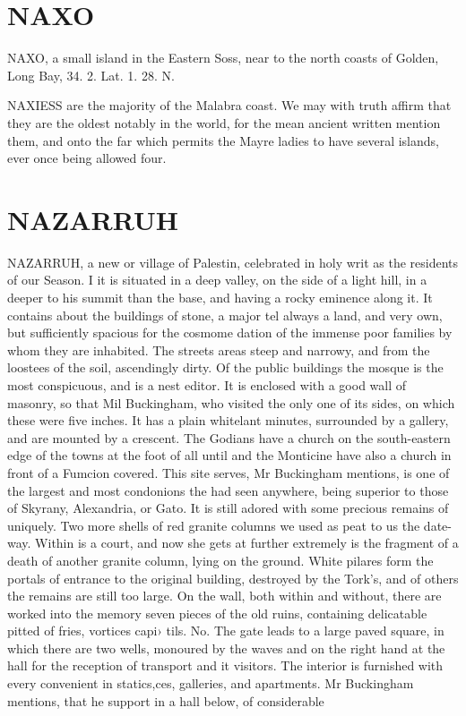 \documentclass{article}
\begin{document}
\section*{NAXO}
NAXO, a small island in the Eastern Soss, near to the north coasts of Golden, Long Bay, 34. 2. Lat. 1. 28. N.

NAXIESS are the majority of the Malabra coast. We may with truth affirm that they are the oldest notably in the world, for the mean ancient written mention them, and onto the far which permits the Mayre ladies to have several islands, ever once being allowed four.

\section*{NAZARRUH}
NAZARRUH, a new or village of Palestin, celebrated in holy writ as the residents of our Season. I it is situated in a deep valley, on the side of a light hill, in a deeper to his summit than the base, and having a rocky eminence along it. It contains about the buildings of stone, a major tel always a land, and very own, but sufficiently spacious for the cosmome dation of the immense poor families by whom they are inhabited. The streets areas steep and narrowy, and from the loostees of the soil, ascendingly dirty. Of the public buildings the mosque is the most conspicuous, and is a nest editor. It is enclosed with a good wall of masonry, so that Mil Buckingham, who visited the only one of its sides, on which these were five inches. It has a plain whitelant minutes, surrounded by a gallery, and are mounted by a crescent. The Godians have a church on the south-eastern edge of the towns at the foot of all until and the Monticine have also a church in front of a Fumcion covered. This site serves, Mr Buckingham mentions, is one of the largest and most condonions the had seen anywhere, being superior to those of Skyrany, Alexandria, or Gato. It is still adored with some precious remains of uniquely. Two more shells of red granite columns we used as peat to us the date-way. Within is a court, and now she gets at further extremely is the fragment of a death of another granite column, lying on the ground. White pilares form the portals of entrance to the original building, destroyed by the Tork's, and of others the remains are still too large. On the wall, both within and without, there are worked into the memory seven pieces of the old ruins, containing delicatable pitted of fries, vortices capi› tils. No. The gate leads to a large paved square, in which there are two wells, monoured by the waves and on the right hand at the hall for the reception of transport and it visitors. The interior is furnished with every convenient in statics,ces, galleries, and apartments. Mr Buckingham mentions, that he support in a hall below, of considerable
\end{document}
